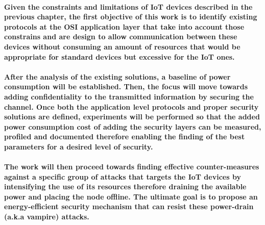 \paragraph{
Given the constraints and limitations of \ac{IoT} devices described in the previous chapter, the first objective of this work is to identify existing protocols at the OSI application layer that take into account those constrains and are design to allow communication between these devices without consuming an amount of resources that would be appropriate for standard devices but excessive for the \ac{IoT} ones.
}

\paragraph{
After the analysis of the existing solutions, a baseline of power consumption will be established. Then, the focus will move towards adding confidentiality to the transmitted information by securing the channel.
Once both the application level protocols and proper security solutions are defined, experiments will be performed so that the added power consumption cost of adding the security layers can be measured, profiled and documented therefore enabling the finding of the best parameters for a desired level of security.
}

\paragraph{
The work will then proceed towards finding effective counter-measures against a specific group of attacks that targets the \ac{IoT} devices by intensifying the use of its resources therefore draining the available power and placing the node offline.
The ultimate goal is to propose an energy-efficient security mechanism that can resist these power-drain (a.k.a vampire) attacks.
}